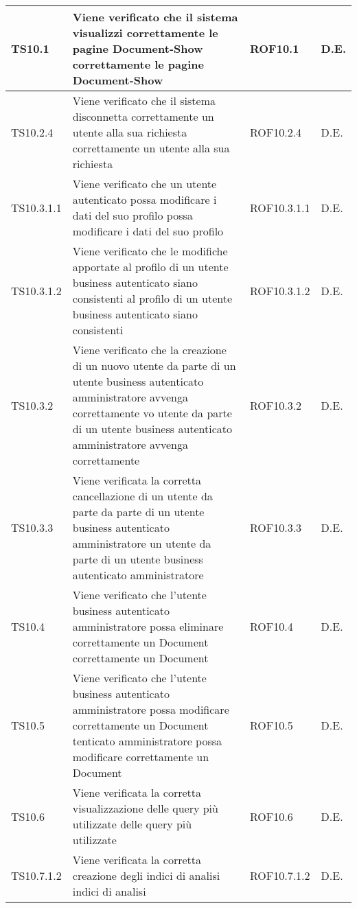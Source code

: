 \begin{center}
\begin{longtable}{|p{2cm}|p{7cm}|p{2cm}|p{2cm}|}
\midrule
TS10.1
& Viene verificato che il sistema visualizzi correttamente le pagine Document-Show
correttamente le pagine Document-Show
& ROF10.1
& D.E.\\


\midrule
TS10.2.4
& Viene verificato che il sistema disconnetta correttamente un utente alla sua richiesta
correttamente un utente alla sua richiesta
& ROF10.2.4
& D.E.\\


\midrule
TS10.3.1.1
& Viene verificato che un utente autenticato possa modificare i dati del suo profilo
possa modificare i dati del suo profilo
& ROF10.3.1.1
& D.E.\\


\midrule
TS10.3.1.2
& Viene verificato che le modifiche apportate al profilo di un utente business autenticato siano consistenti
al profilo di un utente business autenticato
siano consistenti
& ROF10.3.1.2
& D.E.\\


\midrule
TS10.3.2
& Viene verificato che la creazione di un nuovo utente da parte di un utente business autenticato amministratore avvenga correttamente
vo utente da parte di un utente business autenticato amministratore avvenga
correttamente
& ROF10.3.2
& D.E.\\


\midrule
TS10.3.3
& Viene verificata la corretta cancellazione di un  utente da parte da parte di un utente business autenticato amministratore 
un utente da parte di un utente business
autenticato amministratore
& ROF10.3.3
& D.E.\\


\midrule
TS10.4
& Viene verificato che l'utente business autenticato amministratore possa eliminare correttamente un Document
correttamente un Document
& ROF10.4
& D.E.\\


\midrule
TS10.5
& Viene verificato che l'utente business autenticato amministratore possa modificare correttamente un Document
tenticato amministratore possa modificare
correttamente un Document
& ROF10.5
& D.E.\\


\midrule
TS10.6
& Viene verificata la corretta visualizzazione delle query più utilizzate
delle query più utilizzate
& ROF10.6
& D.E.\\


\midrule
TS10.7.1.2
& Viene verificata la corretta creazione degli indici di analisi
indici di analisi
& ROF10.7.1.2
& D.E.\\



\end{longtable}
\end{center}
